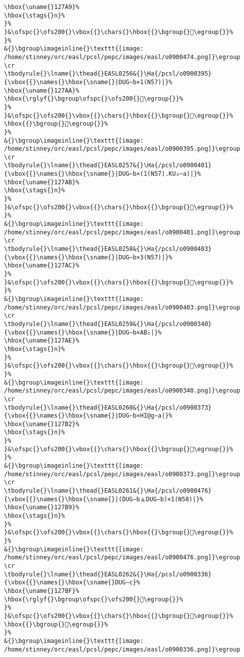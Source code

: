\begin{verbatim}
\hbox{\uname{}127A9}%
\hbox{\stags{}n}%
}%
}&\ofspc{}\ofs200{}\vbox{{}\chars{}\hbox{{}\bgroup{}𒞩\egroup{}}%
}%
&{}\bgroup\imageinline{}\texttt{[image: /home/stinney/orc/easl/pcsl/pepc/images/easl/o0900474.png]}\egroup
\cr
\tbodyrule{}\lname{}\thead{}EASL0256&{}\Ha{/pcsl/o0900395}{\vbox{{}\names{}\hbox{\sname{}|DUG∼b×1(N57)|}%
\hbox{\uname{}127AA}%
\hbox{\rglyf{}\bgroup\ofspc{}\ofs200{}𒞪\egroup{}}%
}%
}&\ofspc{}\ofs200{}\vbox{{}\chars{}\hbox{{}\bgroup{}𒞸\egroup{}}%
\hbox{{}\bgroup{}𒞪\egroup{}}%
}%
&{}\bgroup\imageinline{}\texttt{[image: /home/stinney/orc/easl/pcsl/pepc/images/easl/o0900395.png]}\egroup
\cr
\tbodyrule{}\lname{}\thead{}EASL0257&{}\Ha{/pcsl/o0900401}{\vbox{{}\names{}\hbox{\sname{}|DUG∼b×(1(N57).KU₃∼a)|}%
\hbox{\uname{}127AB}%
\hbox{\stags{}n}%
}%
}&\ofspc{}\ofs200{}\vbox{{}\chars{}\hbox{{}\bgroup{}𒞫\egroup{}}%
}%
&{}\bgroup\imageinline{}\texttt{[image: /home/stinney/orc/easl/pcsl/pepc/images/easl/o0900401.png]}\egroup
\cr
\tbodyrule{}\lname{}\thead{}EASL0258&{}\Ha{/pcsl/o0900403}{\vbox{{}\names{}\hbox{\sname{}|DUG∼b×3(N57)|}%
\hbox{\uname{}127AC}%
}%
}&\ofspc{}\ofs200{}\vbox{{}\chars{}\hbox{{}\bgroup{}𒞬\egroup{}}%
}%
&{}\bgroup\imageinline{}\texttt{[image: /home/stinney/orc/easl/pcsl/pepc/images/easl/o0900403.png]}\egroup
\cr
\tbodyrule{}\lname{}\thead{}EASL0259&{}\Ha{/pcsl/o0900340}{\vbox{{}\names{}\hbox{\sname{}|DUG∼b×AB₂|}%
\hbox{\uname{}127AE}%
\hbox{\stags{}n}%
}%
}&\ofspc{}\ofs200{}\vbox{{}\chars{}\hbox{{}\bgroup{}𒞮\egroup{}}%
}%
&{}\bgroup\imageinline{}\texttt{[image: /home/stinney/orc/easl/pcsl/pepc/images/easl/o0900340.png]}\egroup
\cr
\tbodyrule{}\lname{}\thead{}EASL0260&{}\Ha{/pcsl/o0900373}{\vbox{{}\names{}\hbox{\sname{}|DUG∼b×HI@g∼a|}%
\hbox{\uname{}127B2}%
\hbox{\stags{}n}%
}%
}&\ofspc{}\ofs200{}\vbox{{}\chars{}\hbox{{}\bgroup{}𒞲\egroup{}}%
}%
&{}\bgroup\imageinline{}\texttt{[image: /home/stinney/orc/easl/pcsl/pepc/images/easl/o0900373.png]}\egroup
\cr
\tbodyrule{}\lname{}\thead{}EASL0261&{}\Ha{/pcsl/o0900476}{\vbox{{}\names{}\hbox{\sname{}|(DUG∼b﹠DUG∼b)×1(N58)|}%
\hbox{\uname{}127B9}%
\hbox{\stags{}n}%
}%
}&\ofspc{}\ofs200{}\vbox{{}\chars{}\hbox{{}\bgroup{}𒞹\egroup{}}%
}%
&{}\bgroup\imageinline{}\texttt{[image: /home/stinney/orc/easl/pcsl/pepc/images/easl/o0900476.png]}\egroup
\cr
\tbodyrule{}\lname{}\thead{}EASL0262&{}\Ha{/pcsl/o0900336}{\vbox{{}\names{}\hbox{\sname{}DUG∼c}%
\hbox{\uname{}127BF}%
\hbox{\rglyf{}\bgroup\ofspc{}\ofs200{}𒞿\egroup{}}%
}%
}&\ofspc{}\ofs200{}\vbox{{}\chars{}\hbox{{}\bgroup{}𒞼\egroup{}}%
\hbox{{}\bgroup{}𒞿\egroup{}}%
}%
&{}\bgroup\imageinline{}\texttt{[image: /home/stinney/orc/easl/pcsl/pepc/images/easl/o0900336.png]}\egroup

\end{verbatim}
